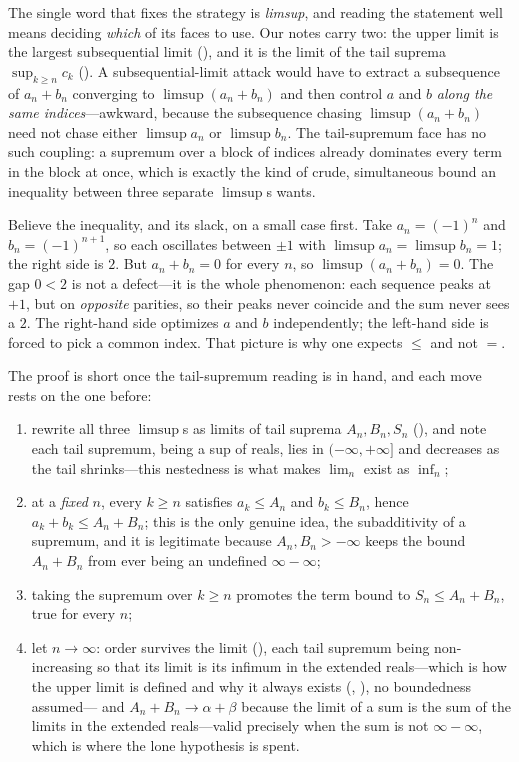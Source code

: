 \documentclass[main.tex]{subfiles}
\begin{document}
\begin{Reflection}
The single word that fixes the strategy is \emph{limsup}, and reading the statement well means deciding
\emph{which} of its faces to use. Our notes carry two: the upper limit is the largest subsequential
limit (), and it is the limit of the tail suprema $\sup_{k\ge n}c_k$ (). A
subsequential-limit attack would have to extract a subsequence of $a_n+b_n$ converging to
$\limsup(a_n+b_n)$ and then control $a$ and $b$ \emph{along the same indices}---awkward, because the
subsequence chasing $\limsup(a_n+b_n)$ need not chase either $\limsup a_n$ or $\limsup b_n$. The
tail-supremum face has no such coupling: a supremum over a block of indices already dominates every term
in the block at once, which is exactly the kind of crude, simultaneous bound an inequality between three
separate $\limsup$s wants.

Believe the inequality, and its slack, on a small case first. Take $a_n=(-1)^n$ and $b_n=(-1)^{n+1}$, so
each oscillates between $\pm1$ with $\limsup a_n=\limsup b_n=1$; the right side is $2$. But
$a_n+b_n=0$ for every $n$, so $\limsup(a_n+b_n)=0$. The gap $0<2$ is not a defect---it is the whole
phenomenon: each sequence peaks at $+1$, but on \emph{opposite} parities, so their peaks never coincide
and the sum never sees a $2$. The right-hand side optimizes $a$ and $b$ independently; the left-hand side
is forced to pick a common index. That picture is why one expects $\le$ and not $=$.

The proof is short once the tail-supremum reading is in hand, and each move rests on the one before:
\begin{enumerate}[leftmargin=1.7em,itemsep=3pt,topsep=2pt,label=\textnormal{(\arabic*)}]
  \item rewrite all three $\limsup$s as limits of tail suprema $A_n,B_n,S_n$ (), and note
        each tail supremum, being a sup of reals, lies in $(-\infty,+\infty]$ and decreases as the tail
        shrinks---this nestedness is what makes $\lim_n$ exist as $\inf_n$;
  \item at a \emph{fixed} $n$, every $k\ge n$ satisfies $a_k\le A_n$ and $b_k\le B_n$, hence $a_k+b_k\le
        A_n+B_n$; this is the only genuine idea, the subadditivity of a supremum, and it is legitimate
        because $A_n,B_n>-\infty$ keeps the bound $A_n+B_n$ from ever being an undefined $\infty-\infty$;
  \item taking the supremum over $k\ge n$ promotes the term bound to $S_n\le A_n+B_n$, true for every $n$;
  \item let $n\to\infty$: order survives the limit (), each tail supremum being non-increasing
        so that its limit is its infimum in the extended reals---which is how the upper limit is defined and
        why it always exists (, ), no boundedness assumed---
        and $A_n+B_n\to\alpha+\beta$ because the limit of a sum is
        the sum of the limits in the extended reals---valid precisely when the sum is not $\infty-\infty$,
        which is where the lone hypothesis is spent.
\end{enumerate}


\end{Reflection}
\end{document}
